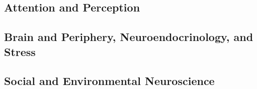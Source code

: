 \subsection*{Attention and Perception}

% 
% 
% 
% 
% 
% 
% 
% 
% 

\subsection*{Brain and Periphery, Neuroendocrinology, and Stress}

% 
% 
% 
% 
% 
% 
% 
% 
% 
% 
% 
% 
% 
% 
% 
% 
% 
% 
% 
% 

\subsection*{Social and Environmental Neuroscience}

% 
% 
% 
% 
% 
% 
% 
% 
% 
% 
% 
% 
% 
% 
% 
% 

